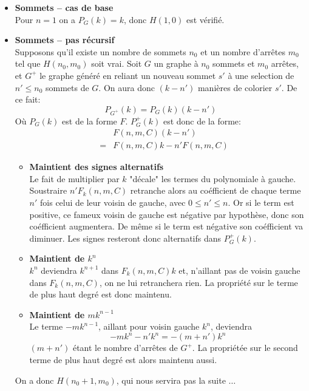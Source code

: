 \begin{itemize}
\item \textbf{Sommets -- cas de base} \\
Pour $n = 1$ on a $P_G(k) = k$, donc $H(1,0)$ est vérifié.
\item \textbf{Sommets -- pas récursif} \\ Supposons qu'il existe un nombre de sommets $n_0$ et un nombre d'arrêtes $m_0$ tel que $H(n_0,m_0)$ soit vrai. Soit $G$ un graphe à $n_0$ sommets et $m_0$ arrêtes, et $G^+$ le graphe généré en reliant un nouveau sommet $s'$ à une selection de $n' \leq n_0$ sommets de $G$. On aura donc $(k-n')$ manières de colorier $s'$. De ce fait:
\[ P_{G^+}(k) = P_G(k)(k-n') \]
Où $P_G(k)$ est de la forme $F$. $P_G^+(k)$ est donc de la forme:
\begin{eqnarray*}
&&	F(n,m,C)(k-n')			\\
&=& F(n,m,C)k - n'F(n,m,C)	
\end{eqnarray*} 
\begin{itemize}
\item \textbf{Maintient des signes alternatifs} \\ 
Le fait de multiplier par $k$ "décale" les termes du polynomiale à gauche. Soustraire $n'F_k(n,m,C)$ retranche alors au coéfficient de chaque terme $n'$ fois celui de leur voisin de gauche, avec $0 \leq n' \leq n$. Or si le term est positive, ce fameux voisin de gauche est négative par hypothèse, donc son coéfficient augmentera. De même si le term est négative son coéfficient va diminuer. Les signes resteront donc alternatifs dans $P_G^+(k)$.
\item \textbf{Maintient de $k^n$} \\
$k^{n}$ deviendra $k^{n+1}$ dans $F_k(n,m,C)k$ et, n'aillant pas de voisin gauche dans $F_k(n,m,C)$, on ne lui retranchera rien. La propriété sur le terme de plus haut degré est donc maintenu.
\item \textbf{Maintient de $mk^{n-1}$} \\
Le terme $-mk^{n-1}$, aillant pour voisin gauche $k^n$, deviendra \[-mk^n - n'k^n = -(m+n')k^n \] $(m+n')$ étant le nombre d'arrêtes de $G^+$. La propriétée sur le second terme de plus haut degré est alors maintenu aussi.
\end{itemize}
On a donc $H(n_0+1, m_0)$, qui nous servira pas la suite $\ldots$


\end{itemize}
